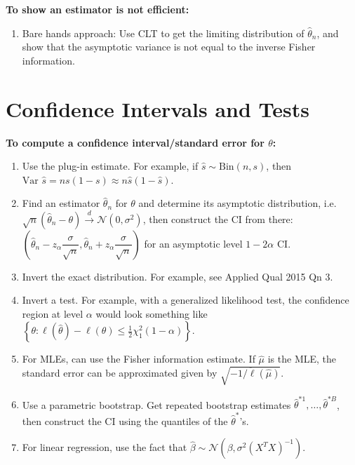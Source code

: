 \documentclass[twoside]{article}
\newcommand\calN{\mathcal{N}}
\newcommand\sg{\sigma}
\def\t{\theta}
\newcommand\cd{\stackrel{d}{\goesto}}
\newcommand\goesto{\rightarrow}
\newcommand\var{\text{Var }}
\begin{document}
\textbf{To show an estimator is not efficient:}
\begin{enumerate}
\item Bare hands approach: Use CLT to get the limiting distribution of $\hat{\t}_n$, and show that the asymptotic variance is not equal to the inverse Fisher information.

\end{enumerate}

\section{Confidence Intervals and Tests}

\textbf{To compute a confidence interval/standard error for $\t$:}
\begin{enumerate}
\item Use the plug-in estimate. For example, if $\hat{s} \sim \text{Bin}(n, s)$, then $\var \hat{s} = ns(1-s) \approx n \hat{s}(1 - \hat{s})$.

\item Find an estimator $\hat{\t}_n$ for $\t$ and determine its asymptotic distribution, i.e. $\sqrt{n}(\hat{\t}_n - \t) \cd \calN(0, \sg^2)$, then construct the CI from there: $\left(\hat{\t}_n - z_\alpha \dfrac{\sg}{\sqrt{n}}, \hat{\t}_n + z_\alpha \dfrac{\sg}{\sqrt{n}} \right)$ for an asymptotic level $1 - 2\alpha$ CI.

\item Invert the exact distribution. For example, see Applied Qual 2015 Qn 3.

\item Invert a test. For example, with a generalized likelihood test, the confidence region at level $\alpha$ would look something like $\left\{ \t: \ell(\hat{\t}) - \ell(\t) \leq \frac{1}{2}\chi_1^2(1-\alpha) \right\}$.

\item For MLEs, can use the Fisher information estimate. If $\hat{\mu}$ is the MLE, the standard error can be approximated given by $\sqrt{-1/\ddot{\ell}(\hat{\mu})}$.

\item Use a parametric bootstrap. Get repeated bootstrap estimates $\hat{\t}^{*1}, \dots, \hat{\t}^{*B}$, then construct the CI using the quantiles of the $\hat{\t}^*$'s.

\item For linear regression, use the fact that $\hat{\beta} \sim \calN(\beta, \sg^2 (X^T X)^{-1})$.

\end{enumerate}
\end{document}

